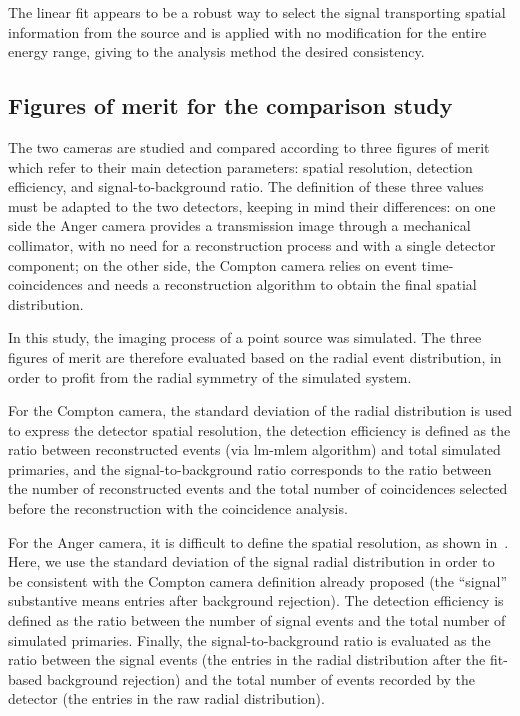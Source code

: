 The linear fit appears to be a robust way to select the signal transporting spatial information from the source and is applied with no modification for the entire energy range, giving to the analysis method the desired consistency.

\subsection{Figures of merit for the comparison study}\label{chap5::subsec::fom}

The two cameras are studied and compared according to three figures of merit which refer to their main detection parameters: spatial resolution, detection efficiency, and signal-to-background ratio. The definition of these three values must be adapted to the two detectors, keeping in mind their differences: on one side the Anger camera provides a transmission image through a mechanical collimator, with no need for a reconstruction process and with a single detector component; on the other side, the Compton camera relies on event time-coincidences and needs a reconstruction algorithm to obtain the final spatial distribution.

In this study, the imaging process of a point source was simulated. The three figures of merit are therefore evaluated based on the radial event distribution, in order to profit from the radial symmetry of the simulated system.

For the Compton camera, the standard deviation of the radial distribution is used to express the detector spatial resolution, the detection efficiency is defined as the ratio between reconstructed events (via \gls{lm-mlem} algorithm) and total simulated primaries, and the signal-to-background ratio corresponds to the ratio between the number of reconstructed events and the total number of coincidences selected before the reconstruction with the coincidence analysis.

For the Anger camera, it is difficult to define the spatial resolution, as shown in~\parencite{Cecchin2015}. Here, we use the standard deviation of the signal radial distribution in order to be consistent with the Compton camera definition already proposed (the \enquote{signal} substantive means entries after background rejection). The detection efficiency is defined as the ratio between the number of signal events and the total number of simulated primaries. Finally, the signal-to-background ratio is evaluated as the ratio between the signal events (the entries in the radial distribution after the fit-based background rejection) and the total number of events recorded by the detector (the entries in the raw radial distribution).

